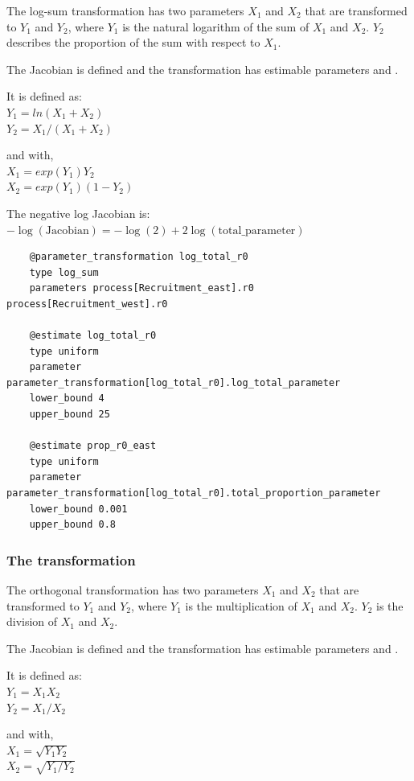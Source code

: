 The log-sum transformation has two parameters $X_1$ and $X_2$ that are transformed to $Y_1$ and $Y_2$, where $Y_1$ is the natural logarithm of the sum of $X_1$ and $X_2$. $Y_2$ describes the proportion of the sum with respect to $X_1$.

The Jacobian is defined and the transformation has estimable parameters  and .

It is defined as:\\
$Y_1 = ln(X_1 + X_2)$\\
$Y_2 = X_1 / (X_1 + X_2)$

and with,\\
$X_1 = exp(Y_1)Y_2$\\
$X_2 =exp(Y_1)(1 - Y_2)$

 The negative log Jacobian is: \\
 $-\log(\text{Jacobian}) = -\log(2) + 2 \log(\text{total\_parameter})$

{\small{\begin{verbatim}
	@parameter_transformation log_total_r0
	type log_sum
	parameters process[Recruitment_east].r0 process[Recruitment_west].r0
	
	@estimate log_total_r0
	type uniform
	parameter parameter_transformation[log_total_r0].log_total_parameter
	lower_bound 4
	upper_bound 25
	
	@estimate prop_r0_east
	type uniform
	parameter parameter_transformation[log_total_r0].total_proportion_parameter
	lower_bound 0.001
	upper_bound 0.8		
\end{verbatim}}}
	
\subsubsection{The  transformation} \label{sec:Transformation-Orthogonal}

The orthogonal transformation has two parameters $X_1$ and $X_2$ that are transformed to $Y_1$ and $Y_2$, where $Y_1$ is the multiplication of $X_1$ and $X_2$. $Y_2$ is the division of $X_1$ and $X_2$.

The Jacobian is defined and the transformation has estimable parameters  and .

It is defined as:\\
$Y_1 = X_1 X_2$\\
$Y_2 = X_1 / X_2$

and with,\\
$X_1 = \sqrt{Y_1 Y_2}$\\
$X_2 = \sqrt{Y_1 / Y_2}$

